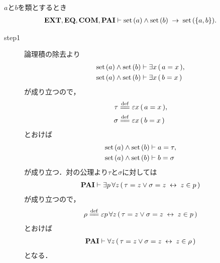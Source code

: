 	\begin{screen}
		\begin{thm}[集合の対は集合である]
		\label{thm:pair_of_sets_is_a_set}
			$a$と$b$を類とするとき
			\begin{align}
				\mbox{{\bf EXT}},\mbox{{\bf EQ}},\mbox{\bf COM},\mbox{{\bf PAI}} \vdash 
				\operatorname*{set}\hspace{0.15em}(a) \wedge \operatorname*{set}\hspace{0.15em}(b) \hspace{0.25em}\rightarrow\hspace{0.25em} \operatorname*{set}\hspace{0.15em}(\{a,b\}).
			\end{align}
		\end{thm}
	\end{screen}
	
	\begin{sketch}\mbox{}
		\begin{description}
			\item[step1]
				論理積の除去より
				\begin{align}
					\operatorname*{set}\hspace{0.15em}(a) \wedge \operatorname*{set}\hspace{0.15em}(b) &\vdash \exists x\, (\, a = x\, ), \\
					\operatorname*{set}\hspace{0.15em}(a) \wedge \operatorname*{set}\hspace{0.15em}(b) &\vdash \exists x\, (\, b = x\, )
				\end{align}
				が成り立つので，
				\begin{align}
					\tau &\defeq \varepsilon x\, (\, a = x\, ), \\
					\sigma &\defeq \varepsilon x\, (\, b = x\, )
				\end{align}
				とおけば
				\begin{align}
					\operatorname*{set}\hspace{0.15em}(a) \wedge \operatorname*{set}\hspace{0.15em}(b) &\vdash a = \tau, 
					\label{fom:pair_of_sets_is_a_set_1} \\
					\operatorname*{set}\hspace{0.15em}(a) \wedge \operatorname*{set}\hspace{0.15em}(b) &\vdash b = \sigma
				\end{align}
				が成り立つ．対の公理より$\tau$と$\sigma$に対しては
				\begin{align}
					\mbox{{\bf PAI}} \vdash \exists p\, \forall z\, 
						(\, \tau = z \vee \sigma = z \hspace{0.25em}\leftrightarrow\hspace{0.25em} z \in p\, )
				\end{align}
				が成り立つので，
				\begin{align}
					\rho \defeq \varepsilon p\, \forall z\, 
						(\, \tau = z \vee \sigma = z \lrarrow z \in p\, )
				\end{align}
				とおけば
				\begin{align}
					\mbox{{\bf PAI}} \vdash \forall z\, (\, \tau = z \vee \sigma = z \hspace{0.25em}\leftrightarrow\hspace{0.25em} z \in \rho\, )
					\label{fom:pair_of_sets_is_a_set_2}
				\end{align}
				となる．
				

\end{description}
\end{sketch}
